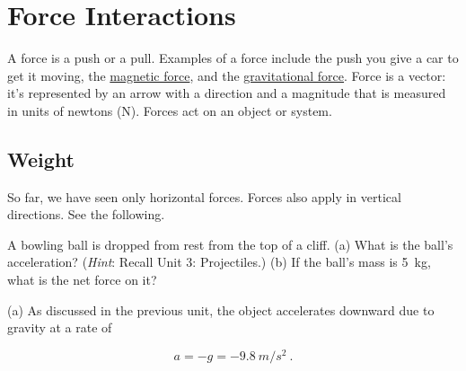 \documentclass[main.tex]{subfiles}
\begin{document}
\tableofcontents

\section{Force Interactions}

A \gls{force} is a push or a pull. Examples of a force include the push you give a car to get it moving, the \href{https://youtu.be/gzCXowhks80?t=3}{magnetic force}, and the \href{https://youtu.be/E9oKEJ1pXPw}{gravitational force}. Force is a vector: it's represented by an arrow with a direction and a magnitude that is measured in units of newtons (N). Forces act on an object or system. 

\subsection{Weight} \label{CWxEgd}

So far, we have seen only horizontal forces. Forces also apply in vertical directions. See the following.

\begin{example} \label{ex:weightIntro} 
A bowling ball is dropped from rest from the top of a cliff. (a) What is the ball's acceleration? (\textit{Hint}: Recall Unit 3: Projectiles.) (b) If the ball's mass is \SI{5}{kg}, what is the net force on it?
\end{example}

\Solution

\begin{center}
\end{center}

(a) As discussed in the previous unit, the object accelerates downward due to gravity at a rate of 

\begin{equation*}
    a = -g = -\SI{9.8}{m/s^2}\ .
\end{equation*}
\end{document}
